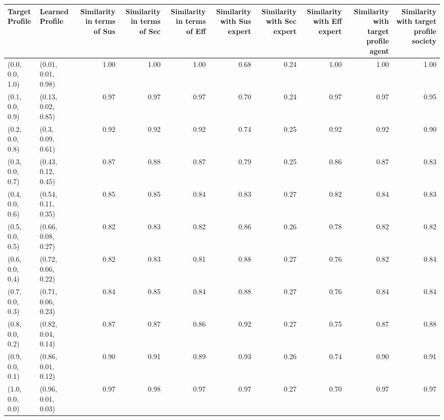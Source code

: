 \begin{tabular}{llrrrrrrrr}
\toprule
Target Profile & Learned Profile & Similarity in terms of Sus & Similarity in terms of Sec & Similarity in terms of Eff & Similarity with Sus expert & Similarity with Sec expert & Similarity with Eff expert & Similarity with target profile agent & Similarity with target profile society \\
\midrule
(0.0, 0.0, 1.0) & (0.01, 0.01, 0.98) & 1.00 & 1.00 & 1.00 & 0.68 & 0.24 & 1.00 & 1.00 & 1.00 \\
(0.1, 0.0, 0.9) & (0.13, 0.02, 0.85) & 0.97 & 0.97 & 0.97 & 0.70 & 0.24 & 0.97 & 0.97 & 0.95 \\
(0.2, 0.0, 0.8) & (0.3, 0.09, 0.61) & 0.92 & 0.92 & 0.92 & 0.74 & 0.25 & 0.92 & 0.92 & 0.90 \\
(0.3, 0.0, 0.7) & (0.43, 0.12, 0.45) & 0.87 & 0.88 & 0.87 & 0.79 & 0.25 & 0.86 & 0.87 & 0.83 \\
(0.4, 0.0, 0.6) & (0.54, 0.11, 0.35) & 0.85 & 0.85 & 0.84 & 0.83 & 0.27 & 0.82 & 0.84 & 0.83 \\
(0.5, 0.0, 0.5) & (0.66, 0.08, 0.27) & 0.82 & 0.83 & 0.82 & 0.86 & 0.26 & 0.78 & 0.82 & 0.82 \\
(0.6, 0.0, 0.4) & (0.72, 0.06, 0.22) & 0.82 & 0.83 & 0.81 & 0.88 & 0.27 & 0.76 & 0.82 & 0.84 \\
(0.7, 0.0, 0.3) & (0.71, 0.06, 0.23) & 0.84 & 0.85 & 0.84 & 0.88 & 0.27 & 0.76 & 0.84 & 0.84 \\
(0.8, 0.0, 0.2) & (0.82, 0.04, 0.14) & 0.87 & 0.87 & 0.86 & 0.92 & 0.27 & 0.75 & 0.87 & 0.88 \\
(0.9, 0.0, 0.1) & (0.86, 0.01, 0.12) & 0.90 & 0.91 & 0.89 & 0.93 & 0.26 & 0.74 & 0.90 & 0.91 \\
(1.0, 0.0, 0.0) & (0.96, 0.01, 0.03) & 0.97 & 0.98 & 0.97 & 0.97 & 0.27 & 0.70 & 0.97 & 0.97 \\
\bottomrule
\end{tabular}
